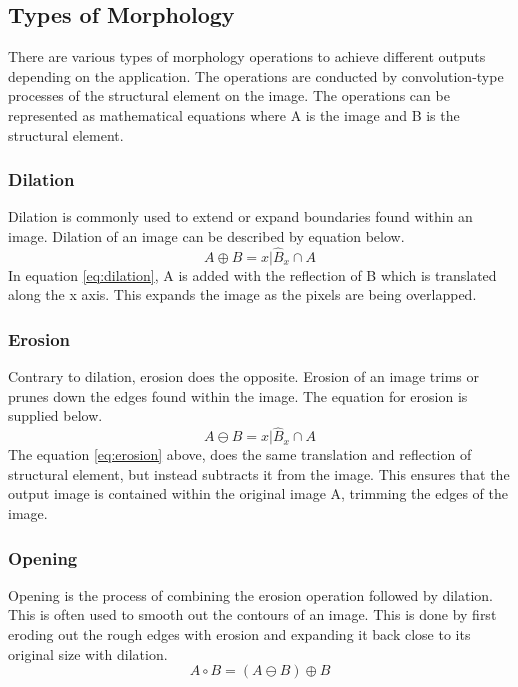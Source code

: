 \subsection{Types of Morphology}
There are various types of morphology operations to achieve different outputs depending on the application. The operations are conducted by convolution-type processes of the structural element on the image. The operations can be represented as mathematical equations where A is the image and B is the structural element.

\subsubsection{Dilation}
Dilation is commonly used to extend or expand boundaries found within an image. Dilation of an image can be described by equation below. 
\begin{equation}
A \oplus B = {x | \hat{B}_x \cap A }
\label{eq:dilation}
\end{equation} 
In equation \ref{eq:dilation}, A is added with the reflection of B which is translated along the x axis. This expands the image as the pixels are being overlapped.


\subsubsection{Erosion}
Contrary to dilation, erosion does the opposite. Erosion of an image trims or prunes down the edges found within the image. The equation for erosion is supplied below.
\begin{equation}
A \ominus B = {x | \hat{B}_x \cap A }
\label{eq:erosion}
\end{equation}
The equation \ref{eq:erosion} above,  does the same translation and reflection of structural element, but instead subtracts it from the image. This ensures that the output image is contained within the original image A, trimming the edges of the image. 

\subsubsection{Opening}
Opening is the process of combining the erosion operation followed by dilation. This is often used to smooth out the contours of an image. This is done by first eroding out the rough edges with erosion and expanding it back close to its original size with dilation.
\begin{equation}
A \circ B = (A \ominus B) \oplus B
\label{eq:open}
\end{equation}

